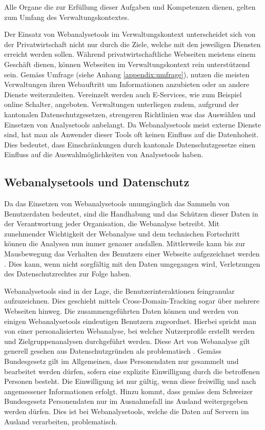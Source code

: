 Alle Organe die zur Erfüllung dieser Aufgaben und Kompetenzen dienen, gelten zum Umfang des Verwaltungskontextes.

Der Einsatz von Webanalysetools im Verwaltungskontext unterscheidet sich von der Privatwirtschaft nicht nur durch die Ziele, welche mit den jeweiligen Diensten erreicht werden sollen. Während privatwirtschaftliche Webseiten meistens einem Geschäft dienen, können Webseiten im Verwaltungskontext rein unterstützend sein. Gemäss Umfrage (siehe Anhang \ref{appendix:umfrage}), nutzen die meisten Verwaltungen ihren Webauftritt um Informationen anzubieten oder an andere Dienste weiterzuleiten. Vereinzelt werden auch E-Services, wie zum Beispiel online Schalter, angeboten. Verwaltungen unterliegen zudem, aufgrund der kantonalen Datenschutzgesetzen, strengeren Richtlinien was das Auswählen und Einsetzen von Analysetools anbelangt. Da Webanalysetools meist externe Dienste sind, hat man als Anwender dieser Tools oft keinen Einfluss auf die Datenhoheit. Dies bedeutet, dass Einschränkungen durch kantonale Datenschutzgesetze einen Einfluss auf die Auswahlmöglichkeiten von Analysetools haben.

\subsection{Webanalysetools und Datenschutz} \label{subsec:datenschutz}

Da das Einsetzen von Webanalysetools unumgänglich das Sammeln von Benutzerdaten bedeutet, sind die Handhabung und das Schützen dieser Daten in der Verantwortung jeder Organisation, die Webanalyse betreibt. Mit zunehmender Wichtigkeit der Webanalyse und dem technischen Fortschritt können die Analysen nun immer genauer ausfallen. Mittlerweile kann bis zur Mausbewegung das Verhalten des Benutzers einer Webseite aufgezeichnet werden \parencite[S. 1]{EcommerceUndDatenschutz}. Dies kann, wenn nicht sorgfältig mit den Daten umgegangen wird, Verletzungen des Datenschutzrechtes zur Folge haben.

Webanalysetools sind in der Lage, die Benutzerinteraktionen feingranular aufzuzeichnen. Dies geschieht mittels Cross-Domain-Tracking sogar über mehrere Webseiten hinweg. Die zusammengeführten Daten können und werden von einigen Webanalysetools eindeutigen Benutzern zugeordnet. Hierbei spricht man von einer personalisierten Webanalyse, bei welcher Nutzerprofile erstellt werden und Zielgruppenanalysen durchgeführt werden. Diese Art von Webanalyse gilt generell gesehen aus Datenschutzgründen als problematisch \parencite[S. 2]{EcommerceUndDatenschutz}. Gemäss Bundesgesetz \parencite[§§ 4 Abs. 5]{SDSG} gilt im Allgemeinen, dass Personendaten nur gesammelt und bearbeitet werden dürfen, sofern eine explizite Einwilligung durch die betroffenen Personen besteht. Die Einwilligung ist nur gültig, wenn diese freiwillig und nach angemessener Informationen erfolgt. Hinzu kommt, dass gemäss dem Schweizer Bundesgesetz \parencite[§§ 6 Abs. 1]{SDSG} Personendaten nur im Ausnahmefall ins Ausland weitergegeben werden dürfen. Dies ist bei Webanalysetools, welche die Daten auf Servern im Ausland verarbeiten, problematisch.

